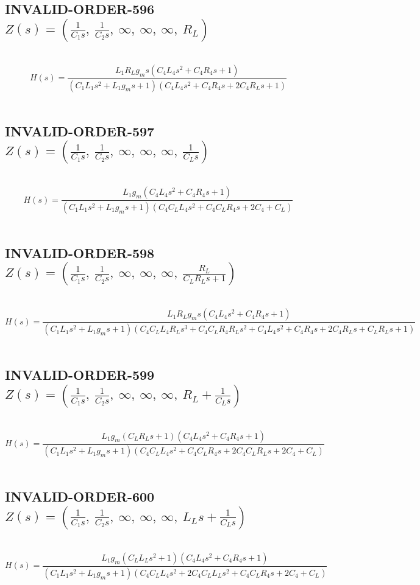 \documentclass{article}
\begin{document}
\subsection{INVALID-ORDER-596 $Z(s) = \left( \frac{1}{C_{1} s}, \  \frac{1}{C_{2} s}, \  \infty, \  \infty, \  \infty, \  R_{L}\right)$ } \ 
\textbf{\[H(s) = \frac{L_{1} R_{L} g_{m} s \left(C_{4} L_{4} s^{2} + C_{4} R_{4} s + 1\right)}{\left(C_{1} L_{1} s^{2} + L_{1} g_{m} s + 1\right) \left(C_{4} L_{4} s^{2} + C_{4} R_{4} s + 2 C_{4} R_{L} s + 1\right)}\] } \ 
\subsection{INVALID-ORDER-597 $Z(s) = \left( \frac{1}{C_{1} s}, \  \frac{1}{C_{2} s}, \  \infty, \  \infty, \  \infty, \  \frac{1}{C_{L} s}\right)$ } \ 
\textbf{\[H(s) = \frac{L_{1} g_{m} \left(C_{4} L_{4} s^{2} + C_{4} R_{4} s + 1\right)}{\left(C_{1} L_{1} s^{2} + L_{1} g_{m} s + 1\right) \left(C_{4} C_{L} L_{4} s^{2} + C_{4} C_{L} R_{4} s + 2 C_{4} + C_{L}\right)}\] } \ 
\subsection{INVALID-ORDER-598 $Z(s) = \left( \frac{1}{C_{1} s}, \  \frac{1}{C_{2} s}, \  \infty, \  \infty, \  \infty, \  \frac{R_{L}}{C_{L} R_{L} s + 1}\right)$ } \ 
\textbf{\[H(s) = \frac{L_{1} R_{L} g_{m} s \left(C_{4} L_{4} s^{2} + C_{4} R_{4} s + 1\right)}{\left(C_{1} L_{1} s^{2} + L_{1} g_{m} s + 1\right) \left(C_{4} C_{L} L_{4} R_{L} s^{3} + C_{4} C_{L} R_{4} R_{L} s^{2} + C_{4} L_{4} s^{2} + C_{4} R_{4} s + 2 C_{4} R_{L} s + C_{L} R_{L} s + 1\right)}\] } \ 
\subsection{INVALID-ORDER-599 $Z(s) = \left( \frac{1}{C_{1} s}, \  \frac{1}{C_{2} s}, \  \infty, \  \infty, \  \infty, \  R_{L} + \frac{1}{C_{L} s}\right)$ } \ 
\textbf{\[H(s) = \frac{L_{1} g_{m} \left(C_{L} R_{L} s + 1\right) \left(C_{4} L_{4} s^{2} + C_{4} R_{4} s + 1\right)}{\left(C_{1} L_{1} s^{2} + L_{1} g_{m} s + 1\right) \left(C_{4} C_{L} L_{4} s^{2} + C_{4} C_{L} R_{4} s + 2 C_{4} C_{L} R_{L} s + 2 C_{4} + C_{L}\right)}\] } \ 
\subsection{INVALID-ORDER-600 $Z(s) = \left( \frac{1}{C_{1} s}, \  \frac{1}{C_{2} s}, \  \infty, \  \infty, \  \infty, \  L_{L} s + \frac{1}{C_{L} s}\right)$ } \ 
\textbf{\[H(s) = \frac{L_{1} g_{m} \left(C_{L} L_{L} s^{2} + 1\right) \left(C_{4} L_{4} s^{2} + C_{4} R_{4} s + 1\right)}{\left(C_{1} L_{1} s^{2} + L_{1} g_{m} s + 1\right) \left(C_{4} C_{L} L_{4} s^{2} + 2 C_{4} C_{L} L_{L} s^{2} + C_{4} C_{L} R_{4} s + 2 C_{4} + C_{L}\right)}\] } \ 
\end{document}
